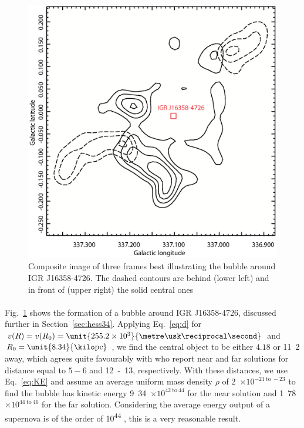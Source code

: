 \documentclass[a4paper, titlepage, oneside]{article}
\newcommand{\e}[1]{\ensuremath{\times 10^{#1}}}
\newcommand{\parsec}{\mathrm{pc}}
\begin{document}
\begin{multicols}{2}
\begin{figure}[H]
  \centering
  \includegraphics[width = \columnwidth]{figures/bubble34}
  \caption{Composite image of three frames best illustrating the bubble around IGR J16358-4726. The dashed contours are behind (lower left) and in front of (upper right) the solid central ones}
  \label{fig:bubble34}
\end{figure}

\paragraph{}
Fig.~\ref{fig:bubble34} shows the formation of a bubble around IGR J16358-4726, discussed further in Section~\ref{sec:hess34}. Applying Eq.~\ref{eq:d} for \(v(R) = v(R_0) = \unit{255.2\e{3}}{\metre\usk\reciprocal\second}\) and \(R_0 = \unit{8.34}{\kilo\parsec}\) \parencite{Reid:2014}, we find the central object to be either \(4.18\) or \unit{11.2}{\kilo\parsec} away, which agrees quite favourably with \textcite{Lutovinov:2005} who report near and far solutions for distance equal to \(5 - 6\) and \unit{12 - 13}{\kilo\parsec}, respectively. With these distances, we use Eq.~\ref{eq:KE} and assume an average uniform mass density \(\rho\) of \unit{2\e{-21 \mathrm{~to~} -23}}{\kilo\gram\usk\centi\metre\rpcubed} \parencite{Ferriere:2001} to find the bubble has kinetic energy \unit{9.34\e{42 \mathrm{~to~} 44}}{\joule} for the near solution and \unit{1.78\e{44 \mathrm{~to~} 46}}{\joule} for the far solution. Considering the average energy output of a supernova is of the order of \unit{10^{44}}{\joule} \parencite{Khokhlov:1993}, this is a very reasonable result.


\end{multicols}
\end{document}
